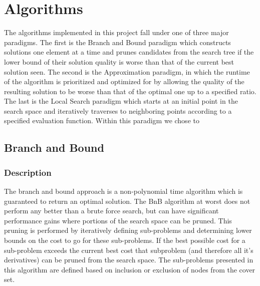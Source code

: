 \documentclass[acmlarge]{acmart}
\begin{document}
\section{Algorithms}


The algorithms implemented in this project fall under one of three major paradigms. The first is the Branch and Bound paradigm which constructs solutions one element at a time and prunes candidates from the search tree if the lower bound of their solution quality is worse than that of the current best solution seen. The second is the Approximation paradigm, in which the runtime of the algorithm is prioritized and optimized for by allowing the quality of the resulting solution to be worse than that of the optimal one up to a specified ratio. The last is the Local Search paradigm which starts at an initial point in the search space and iteratively traverses to neighboring points according to a specified evaluation function. Within this paradigm we chose to 

\subsection{Branch and Bound}

\subsubsection{Description}
The branch and bound approach is a non-polynomial time algorithm which is guaranteed to return an optimal solution. The BnB algorithm at worst does not perform any better than a brute force search, but can have significant performance gains where portions of the search space can be pruned. This pruning is performed by iteratively defining sub-problems and determining lower bounds on the cost to go for these sub-problems. If the best possible cost for a sub-problem exceeds the current best cost that subproblem (and therefore all it's derivatives) can be pruned from the search space. The sub-problems presented in this algorithm are defined based on inclusion or exclusion of nodes from the cover set.
\newpage
\end{document}
